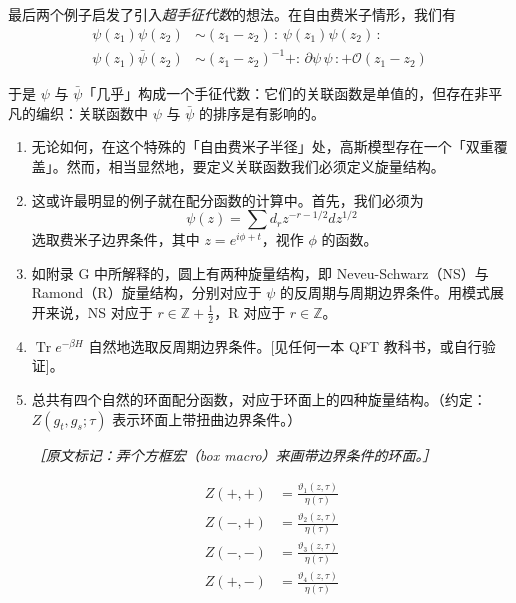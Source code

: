 最后两个例子启发了引入\emph{超手征代数}的想法。在自由费米子情形，我们有
\begin{equation}
  \begin{aligned}
    \psi(z_1)\psi(z_2) &\sim (z_1-z_2)\,{:}\,\psi(z_1)\psi(z_2)\,{:}\\
    \psi(z_1)\bar\psi(z_2) &\sim (z_1-z_2)^{-1}+{:}\,\partial\psi\,\psi\,{:}+\mathcal{O}(z_1-z_2)
  \end{aligned}
  \tag{2.341}
  \label{eq:2.341}
\end{equation}

于是 $\psi$ 与 $\bar\psi$「几乎」构成一个手征代数：它们的关联函数是单值的，但存在非平凡的编织：关联函数中 $\psi$ 与 $\bar\psi$ 的排序是有影响的。

\begin{enumerate}[start=3]
  \item 无论如何，在这个特殊的「自由费米子半径」处，高斯模型存在一个「双重覆盖」。然而，相当显然地，要定义关联函数我们必须定义旋量结构。

  \item 这或许最明显的例子就在配分函数的计算中。首先，我们必须为
  \begin{equation}
    \psi(z)=\sum d_rz^{-r-1/2}dz^{1/2}
    \tag{2.342}
    \label{eq:2.342}
  \end{equation}
  选取费米子边界条件，其中 $z=e^{i\phi+t}$，视作 $\phi$ 的函数。

  \item 如附录 G 中所解释的，圆上有两种旋量结构，即 Neveu-Schwarz（NS）与 Ramond（R）旋量结构，分别对应于 $\psi$ 的反周期与周期边界条件。用模式展开来说，NS 对应于 $r\in\mathbb{Z}+\frac12$，R 对应于 $r\in\mathbb{Z}$。

  \item $\operatorname{Tr}e^{-\beta H}$ 自然地选取反周期边界条件。[见任何一本 QFT 教科书，或自行验证]。

  \item 总共有四个自然的环面配分函数，对应于环面上的四种旋量结构。（约定：$Z(g_t,g_s;\tau)$ 表示环面上带扭曲边界条件。）

  {\small\itshape ［原文标记：弄个方框宏（box macro）来画带边界条件的环面。］}

  \begin{equation}
    \begin{aligned}
      Z(+,+) &= \frac{\vartheta_1(z,\tau)}{\eta(\tau)}\\
      Z(-,+) &= \frac{\vartheta_2(z,\tau)}{\eta(\tau)}\\
      Z(-,-) &= \frac{\vartheta_3(z,\tau)}{\eta(\tau)}\\
      Z(+,-) &= \frac{\vartheta_4(z,\tau)}{\eta(\tau)}
    \end{aligned}
    \tag{2.343}
    \label{eq:2.343}
  \end{equation}


\end{enumerate}
